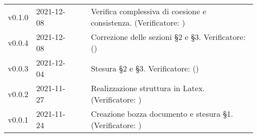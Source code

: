 \begin{longtable}{ m{}<{\centering}  m{}<{\centering}  m{}<{\centering}  m{}<{\centering}  m{}<{\centering} }
	v0.1.0& 2021-12-08 & \EP{} & \VE{} & Verifica complessiva di coesione e consistenza. (Verificatore: \textit{\FP}) \\	

	v0.0.4& 2021-12-08 & \MB{} & \AM{} & Correzione delle sezioni §2 e §3. Verificatore: (\textit{\FP}) \\

	v0.0.3& 2021-12-04 & \MB{} & \AM{} & Stesura §2 e §3. Verificatore: (\textit{\FP}) \\

	v0.0.2& 2021-11-27 & \EP{} & \AM{} & Realizzazione struttura in Latex. (Verificatore: \textit{\FP})\\

	v0.0.1& 2021-11-24 & \MB{} & \RE{} & Creazione bozza documento e stesura §1. (Verificatore: \textit{\FP}) \\

\end{longtable}

\pagebreak
